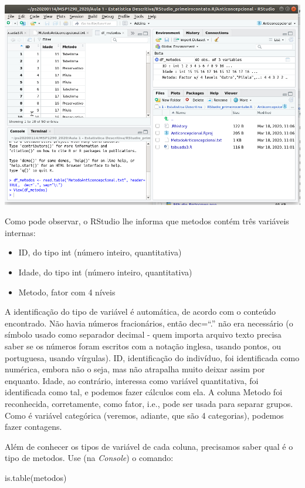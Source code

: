 \documentclass[
]{article}
\newenvironment{Shaded}{\begin{snugshade}}{\end{snugshade}}
\newcommand{\FunctionTok}[1]{\textcolor[rgb]{0.00,0.00,0.00}{#1}}
\newcommand{\NormalTok}[1]{#1}
\providecommand{\tightlist}{%
  \setlength{\itemsep}{0pt}\setlength{\parskip}{0pt}}
\begin{document}
\begin{center}\includegraphics[width=0.9\linewidth]{RStudio_Tabela} \end{center}

Como pode observar, o RStudio lhe informa que metodos contém três
variáveis internas:

\begin{itemize}
\tightlist
\item
  ID, do tipo int (número inteiro, quantitativa)
\item
  Idade, do tipo int (número inteiro, quantitativa)
\item
  Metodo, fator com 4 níveis
\end{itemize}

A identificação do tipo de variável é automática, de acordo com o
conteúdo encontrado. Não havia números fracionários, então dec=``.'' não
era necessário (o símbolo usado como separador decimal - quem importa
arquivo texto precisa saber se os números foram escritos com a notação
inglesa, usando pontos, ou portuguesa, usando vírgulas). ID,
identificação do indivíduo, foi identificada como numérica, embora não o
seja, mas não atrapalha muito deixar assim por enquanto. Idade, ao
contrário, interessa como variável quantitativa, foi identificada como
tal, e podemos fazer cálculos com ela. A coluna Metodo foi reconhecida,
corretamente, como fator, i.e., pode ser usada para separar grupos. Como
é variável categórica (veremos, adiante, que são 4 categorias), podemos
fazer contagens.

Além de conhecer os tipos de variável de cada coluna, precisamos saber
qual é o tipo de metodos. Use (na \emph{Console}) o comando:

\begin{Shaded}
\begin{Highlighting}[]
\FunctionTok{is.table}\NormalTok{(metodos)}
\end{Highlighting}
\end{Shaded}
\end{document}

